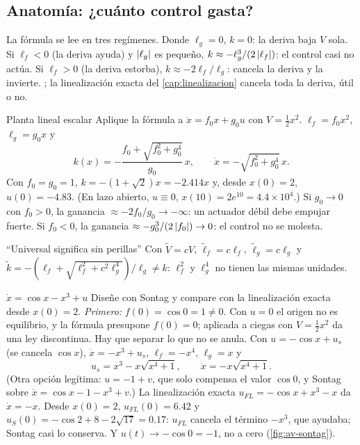 \subsection{Anatomía: ¿cuánto control gasta?}

La fórmula se lee en tres regímenes. Donde $\ell_g=0$, $k=0$: la deriva baja $V$ sola. Si $\ell_f<0$ (la deriva ayuda) y $\left\lvert \ell_g\right\rvert$ es pequeño, $k\approx-\ell_g^3/(2\left\lvert \ell_f\right\rvert)$: el control casi no actúa. Si $\ell_f>0$ (la deriva estorba), $k\approx-2\ell_f/\ell_g$: cancela la deriva y la invierte. ; la linealización exacta del \cref{cap:linealizacion} cancela toda la deriva, útil o no.

\begin{ejemplo}[label=ej:av-sontaglineal]{Planta lineal escalar}
Aplique la fórmula a $\dot x=f_0x+g_0u$ con $V=\tfrac12x^2$.
\solucion $\ell_f=f_0x^2$, $\ell_g=g_0x$ y
\[
  k(x)=-\frac{f_0+\sqrt{f_0^2+g_0^4}}{g_0}\,x,\qquad\dot x=-\sqrt{f_0^2+g_0^4}\,x .
\]
Con $f_0=g_0=1$, $k=-(1+\sqrt2)x=-2.414x$ y, desde $x(0)=2$, $u(0)=-4.83$. (En lazo abierto, $u\equiv0$, $x(10)=2e^{10}=4.4\times10^4$.) Si $g_0\to0$ con $f_0>0$, la ganancia $\approx-2f_0/g_0\to-\infty$: un actuador débil debe empujar fuerte. Si $f_0<0$, la ganancia $\approx-g_0^3/(2\left\lvert f_0\right\rvert)\to0$: el control no se molesta.
\end{ejemplo}

\begin{trampa}[label=tr:av-escala]{``Universal significa sin perillas''}
Con $\tilde V=cV$, $\tilde\ell_f=c\ell_f$, $\tilde\ell_g=c\ell_g$ y $\tilde k=-(\ell_f+\sqrt{\ell_f^2+c^2\ell_g^4})/\ell_g\neq k$: $\ell_f^2$ y $\ell_g^4$ no tienen las mismas unidades.
\end{trampa}

\begin{ejemplo}[label=ej:av-sontagcos]{$\dot x=\cos x-x^3+u$}
Diseñe con Sontag y compare con la linealización exacta desde $x(0)=2$.
\solucion \emph{Primero:} $f(0)=\cos0=1\neq0$. Con $u=0$ el origen no es equilibrio, y la fórmula presupone $f(0)=0$; aplicada a ciegas con $V=\tfrac12x^2$ da una ley discontinua. Hay que separar lo que no se anula. Con $u=-\cos x+u_s$ (se cancela $\cos x$), $\dot x=-x^3+u_s$, $\ell_f=-x^4$, $\ell_g=x$ y
\[
  u_s=x^3-x\sqrt{x^4+1},\qquad\dot x=-x\sqrt{x^4+1} .
\]
(Otra opción legítima: $u=-1+v$, que solo compensa el valor $\cos0$, y Sontag sobre $\dot x=\cos x-1-x^3+v$.) La linealización exacta $u_{FL}=-\cos x+x^3-x$ da $\dot x=-x$. Desde $x(0)=2$, $u_{FL}(0)=6.42$ y $u_S(0)=-\cos2+8-2\sqrt{17}=0.17$: $u_{FL}$ cancela el término $-x^3$, que ayudaba; Sontag casi lo conserva. Y $u(t)\to-\cos0=-1$, no a cero (\cref{fig:av-sontag}).
\end{ejemplo}

